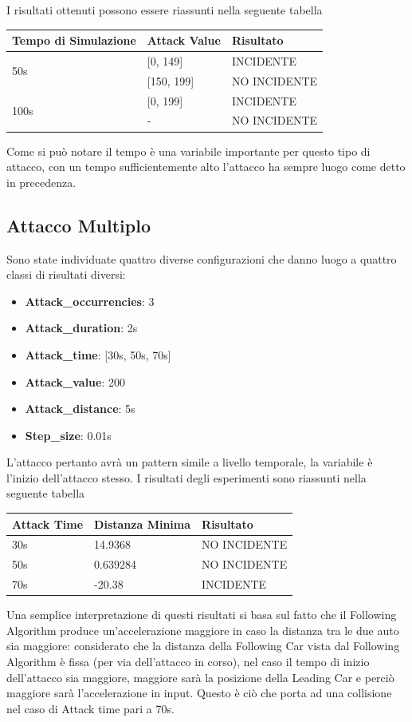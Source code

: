  I risultati ottenuti possono essere riassunti nella seguente tabella
 
\renewcommand{\arraystretch}{2}
\begin{center}
	\begin{tabular}{ |p{6cm}|p{3cm}|p{4cm}|  }
		\hline
		Tempo di Simulazione& Attack Value & Risultato \\
		\hline
		\multirow{2}{4em}{50s} & [0, 149] & INCIDENTE \\
		\cline{2-3}
		& [150, 199] & NO INCIDENTE \\
		\hline
		\multirow{2}{4em}{100s} & [0, 199] & INCIDENTE \\
		\cline{2-3}
		& - & NO INCIDENTE \\
		\hline
	\end{tabular}
\end{center}
Come si può notare il tempo è una variabile importante per questo tipo di attacco, con un tempo sufficientemente alto l'attacco ha sempre luogo come detto in precedenza.

\subsection{Attacco Multiplo}
Sono state individuate quattro diverse configurazioni che danno luogo a quattro classi di risultati diversi:
\begin{itemize}
	\item \textbf{Attack\_occurrencies}: 3
	\item \textbf{Attack\_duration}: 2s
	\item \textbf{Attack\_time}: [30s, 50s, 70s]
	\item \textbf{Attack\_value}: 200
	\item \textbf{Attack\_distance}: 5s
	\item \textbf{Step\_size}: 0.01s
\end{itemize}
L'attacco pertanto avrà un pattern simile a livello temporale, la variabile è l'inizio dell'attacco stesso. I risultati degli esperimenti sono riassunti nella seguente tabella
\renewcommand{\arraystretch}{1.5}
\begin{center}
	\begin{tabular}{ |p{4cm}|p{5cm}| p{4cm}|  }
		\hline
		Attack Time & Distanza Minima & Risultato \\
		\hline
		30s & 14.9368 & NO INCIDENTE \\
		\hline
		50s & 0.639284 & NO INCIDENTE \\
		\hline
		70s & -20.38 & INCIDENTE \\
		\hline
	\end{tabular}
\end{center}
Una semplice interpretazione di questi risultati si basa sul fatto che il Following Algorithm produce un'accelerazione maggiore in caso la distanza tra le due auto sia maggiore: considerato che la distanza della Following Car vista dal Following Algorithm è fissa (per via dell'attacco in corso), nel caso il tempo di inizio dell'attacco sia maggiore, maggiore sarà la posizione della Leading Car e perciò maggiore sarà l'accelerazione in input. Questo è ciò che porta ad una collisione nel caso di Attack time pari a 70s.